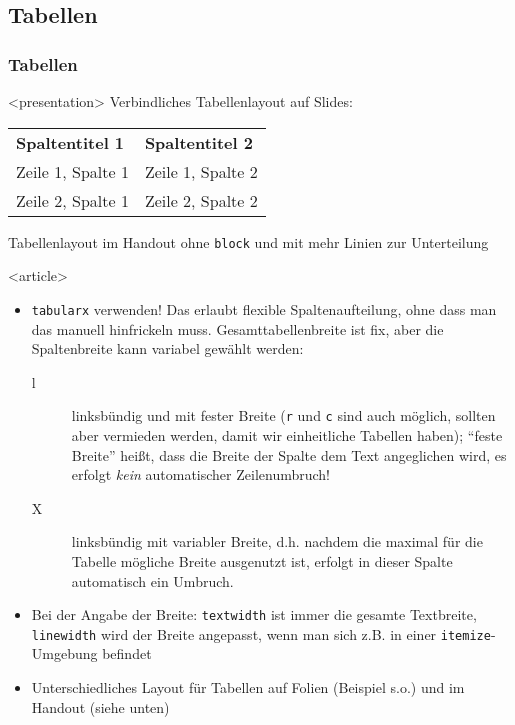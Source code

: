 \subsection{Tabellen}
\begin{frame}[fragile]
\frametitle<presentation>{Tabellen}


\mode
<presentation>
Verbindliches Tabellenlayout auf Slides:
\begin{block}{}
\begin{tabularx}{\textwidth}{XX}
\textbf{Spaltentitel 1} & \textbf{Spaltentitel 2}\\
Zeile 1, Spalte 1 & Zeile 1, Spalte 2\\
Zeile 2, Spalte 1 & Zeile 2, Spalte 2\\
\end{tabularx}
\end{block}

Tabellenlayout im Handout ohne \verb+block+ und mit mehr Linien zur Unterteilung

\mode
<article>
\begin{itemize}
 \item \texttt{tabularx} verwenden! Das erlaubt flexible Spaltenaufteilung, ohne dass man das manuell hinfrickeln muss. Gesamttabellenbreite ist fix, aber die Spaltenbreite kann variabel gewählt werden:
\begin{description}
 \item[l] linksbündig und mit fester Breite (\texttt{r} und \texttt{c} sind auch möglich, sollten aber vermieden werden, damit wir einheitliche Tabellen haben); "`feste Breite"' heißt, dass die Breite der Spalte dem Text angeglichen wird, es erfolgt \textit{kein} automatischer Zeilenumbruch!
 \item[X] linksbündig mit variabler Breite, d.h. nachdem die maximal für die Tabelle mögliche Breite ausgenutzt ist, erfolgt in dieser Spalte automatisch ein Umbruch.
\end{description}
\item Bei der Angabe der Breite: \texttt{textwidth} ist immer die gesamte Textbreite, \texttt{linewidth} wird der Breite angepasst, wenn man sich z.B. in einer \texttt{itemize}-Umgebung befindet
\item Unterschiedliches Layout für Tabellen auf Folien (Beispiel s.o.) und im Handout (siehe unten)
\end{itemize}


\end{frame}
